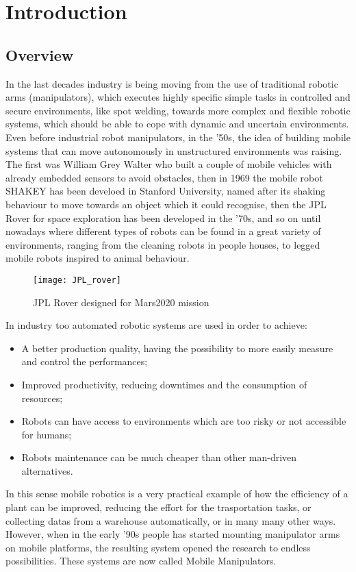\chapter{Introduction}
\label{chapter1}

\section{Overview}
In the last decades industry is being moving from the use of traditional robotic arms (manipulators), which executes highly specific simple tasks in controlled and secure environments, like spot welding, towards more complex and flexible robotic systems, which should be able to cope with dynamic and uncertain environments. \\ 
Even before industrial robot manipulators, in the '50s, the idea of building mobile systems that can move autonomously in unstructured environments was raising. The first was William Grey Walter who built a couple of mobile vehicles with already embedded sensors to avoid obstacles, then in 1969 the mobile robot SHAKEY has been develoed in Stanford University, named after its shaking behaviour to move towards an object which it could recognise, then the JPL Rover for space exploration has been developed in the '70s, and so on until nowadays where different types of robots can be found in a great variety of environments, ranging from the cleaning robots in people houses, to legged mobile robots inspired to animal behaviour.
\begin{figure}[h!]
	\centering
	\texttt{[image: JPL\_rover]}
	\caption{JPL Rover designed for Mars2020 mission}
\end{figure}
In industry too automated robotic systems are used in order to achieve:
\begin{itemize}
	\item A better production quality, having the possibility to more easily measure and control the performances;
	\item Improved productivity, reducing downtimes and the consumption of resources;
	\item Robots can have access to environments which are too risky or not accessible for humans;
	\item Robots maintenance can be much cheaper than other man-driven alternatives. 
\end{itemize}
In this sense mobile robotics is a very practical example of how the efficiency of a plant can be improved, reducing the effort for the trasportation tasks, or collecting datas from a warehouse automatically, or in many many other ways.\\
However, when in the early '90s people has started mounting manipulator arms on mobile platforms, the resulting system opened the research to endless possibilities. These systems are now called Mobile Manipulators.

